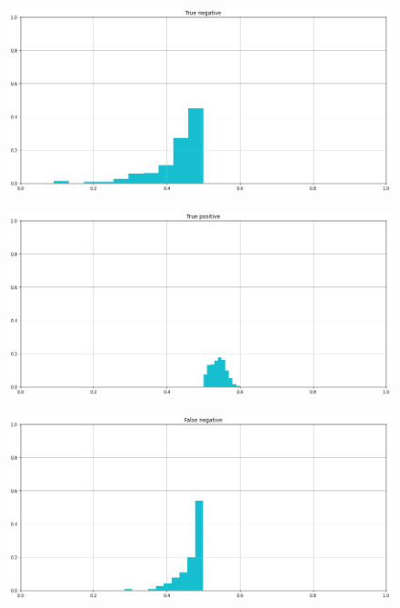 \documentclass[12pt]{report}
\theoremstyle{definition}
\begin{document}
\begin{figure}
\centering
    \begin{minipage}{0.48\textwidth}
     \includegraphics[width=\linewidth]{images/experiment_beta5_disgiunti/tn.png}\label{tn_b5d}
   \end{minipage}
   \begin{minipage}{0.48\textwidth}
     \includegraphics[width=\linewidth]{images/experiment_beta5_disgiunti/tp.png}\label{tp_b5d}
   \end{minipage}
   \begin{minipage}{0.48\textwidth}
     \includegraphics[width=\linewidth]{images/experiment_beta5_disgiunti/fn.png}\label{fn_b5d}
   \end{minipage}

\end{figure}
\end{document}
